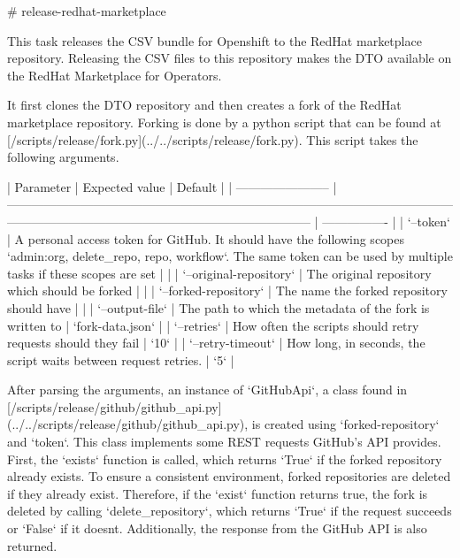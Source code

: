 # release-redhat-marketplace

This task releases the CSV bundle for Openshift to the RedHat marketplace repository.
Releasing the CSV files to this repository makes the DTO available on the RedHat Marketplace for Operators.

It first clones the DTO repository and then creates a fork of the RedHat marketplace repository.
Forking is done by a python script that can be found at [/scripts/release/fork.py](../../scripts/release/fork.py).
This script takes the following arguments.

| Parameter               | Expected value                                                                                                                                                                         | Default          |
| ----------------------- | -------------------------------------------------------------------------------------------------------------------------------------------------------------------------------------- | ---------------- |
| `--token`               | A personal access token for GitHub. It should have the following scopes `admin:org, delete_repo, repo, workflow`. The same token can be used by multiple tasks if these scopes are set |                  |
| `--original-repository` | The original repository which should be forked                                                                                                                                         |                  |
| `--forked-repository`   | The name the forked repository should have                                                                                                                                             |                  |
| `--output-file`         | The path to which the metadata of the fork is written to                                                                                                                               | `fork-data.json` |
| `--retries`             | How often the scripts should retry requests should they fail                                                                                                                           | `10`             |
| `--retry-timeout`       | How long, in seconds, the script waits between request retries.                                                                                                                        | `5`              |

After parsing the arguments, an instance of `GitHubApi`, a class found in [/scripts/release/github/github_api.py](../../scripts/release/github/github_api.py), is created using `{forked-repository}` and `{token}`.
This class implements some REST requests GitHub's API provides.
First, the `exists` function is called, which returns `True` if the forked repository already exists.
To ensure a consistent environment, forked repositories are deleted if they already exist.
Therefore, if the `exist` function returns true, the fork is deleted by calling `delete_repository`, which returns `True` if the request succeeds or `False` if it doesnt.
Additionally, the response from the GitHub API is also returned.

